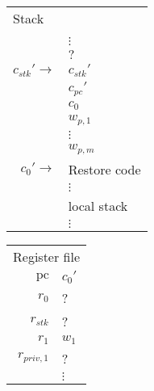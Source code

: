 \documentclass[a4paper]{article}
\newcommand{\var}[1]{\mathit{#1}}
\newcommand{\pc}{\mathit{pc}}
\newcommand{\pcreg}{\mathrm{pc}}
\begin{document}
              \begin{figure}
                \label{fig:stack-upon-return}
                \centering
                \begin{tabular}[!h]{r | >{\raggedright\arraybackslash}p{3cm} |}
                  \multicolumn{2}{l}{Stack} \\
                  \cline{2-2}
               & \\
               & $\vdots$\\
                  \cline{2-2} 
               & $?$\\
                  \cline{2-2} 
                  $c_{\var{stk}}' \rightarrow$  & $c_{\var{stk}}'$ \\
                  \cline{2-2}
               & $c_\pc'$ \\
                  \cline{2-2}
               & $c_0$ \\
                  \cline{2-2}
               & $w_{p,1}$ \\
                  \cline{2-2}
               & $\vdots$ \\
                  \cline{2-2}
               & $w_{p,m}$ \\
                  \cline{2-2}
                  $c_0' \rightarrow$   & Restore code \\
               & $\vdots$\\
                  \cline{2-2}
               & local stack\\
               & $\vdots$\\
                  \cline{2-2}
                \end{tabular}
                \hspace{1cm}
                \begin{tabular}{r | >{\centering\arraybackslash}p{0.75cm} |}
                  \multicolumn{2}{r}{Register file} \\
                  \cline{2-2}
                  $\pcreg$ & $c_0'$\\
                  \cline{2-2}
                  $r_0$  &  ? \\
                  \cline{2-2}
                  $r_{\var{stk}}$  & ? \\
                  \cline{2-2}
                  $r_1$ & $w_1$ \\
                  \cline{2-2}
                  $r_{\var{priv},1}$ & ?\\
                  \cline{2-2}
                           & $\vdots$ \\

\end{tabular}
\end{figure}
\end{document}
